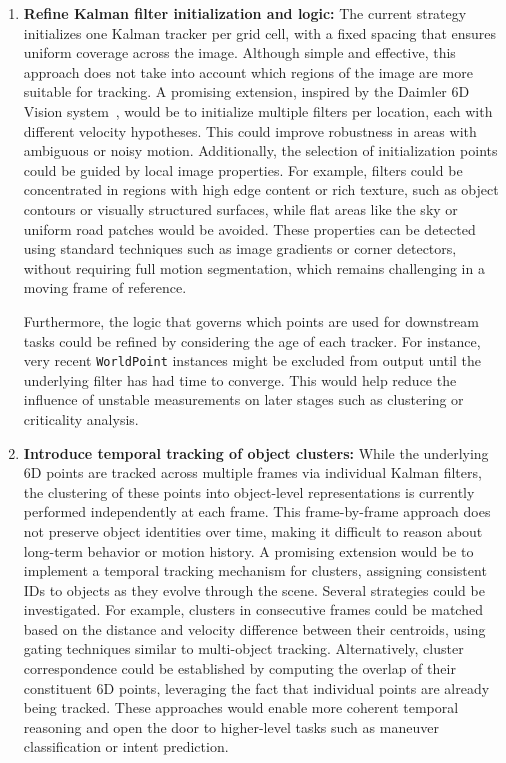 \begin{enumerate}
  \item \textbf{Refine Kalman filter initialization and logic:} The current 
      strategy initializes one Kalman tracker per grid cell, with a fixed 
      spacing that ensures uniform coverage across the image. Although 
      simple and effective, this approach does not take into account which 
      regions of the image are more suitable for tracking. A promising 
      extension, inspired by the Daimler 6D Vision system~\cite{6d_vision_daimler}, 
      would be to initialize multiple filters per location, each with 
      different velocity hypotheses. This could improve robustness in areas 
      with ambiguous or noisy motion. Additionally, the selection of 
      initialization points could be guided by local image properties. 
      For example, filters could be concentrated in regions with high edge 
      content or rich texture, such as object contours or visually structured 
      surfaces, while flat areas like the sky or uniform road patches would 
      be avoided. These properties can be detected using standard techniques 
      such as image gradients or corner detectors, without requiring full 
      motion segmentation, which remains challenging in a moving frame 
      of reference.

      Furthermore, the logic that governs which points are used for downstream 
      tasks could be refined by considering the age of each tracker. 
      For instance, very recent \texttt{WorldPoint} instances might be excluded 
      from output until the underlying filter has had time to converge. This 
      would help reduce the influence of unstable measurements on later stages 
      such as clustering or criticality analysis. 

  
  \item \textbf{Introduce temporal tracking of object clusters:} While the 
      underlying 6D points are tracked across multiple frames via individual 
      Kalman filters, the clustering of these points into object-level 
      representations is currently performed independently at each frame. 
      This frame-by-frame approach does not preserve object identities 
      over time, making it difficult to reason about long-term behavior 
      or motion history. A promising extension would be to implement a 
      temporal tracking mechanism for clusters, assigning consistent IDs 
      to objects as they evolve through the scene. Several strategies could 
      be investigated. For example, clusters in consecutive frames could be 
      matched based on the distance and velocity difference between their 
      centroids, using gating techniques similar to multi-object tracking. 
      Alternatively, cluster correspondence could be established by 
      computing the overlap of their constituent 6D points, leveraging the 
      fact that individual points are already being tracked. These approaches 
      would enable more coherent temporal reasoning and open the door to 
      higher-level tasks such as maneuver classification or intent prediction.


\end{enumerate}
